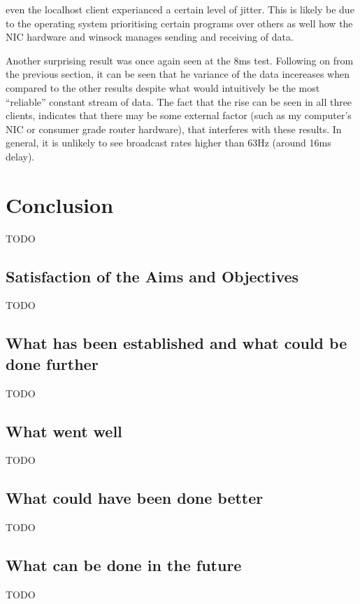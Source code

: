  even the localhost client experianced a certain level of jitter. This is likely be due to the operating system prioritising certain programs over others as well how the NIC hardware and winsock manages sending and receiving of data.

Another surprising result was once again seen at the 8ms test. Following on from the previous section, it can be seen that he variance of the data incereases when compared to the other results despite what would intuitively be the most ``reliable'' constant stream of data. The fact that the rise can be seen in all three clients, indicates that there may be some external factor (such as my computer's NIC or consumer grade router hardware), that interferes with these results. In general, it is unlikely to see broadcast rates higher than 63Hz (around 16ms delay).



\chapter{Conclusion}
TODO


\section{Satisfaction of the Aims and Objectives}
TODO


\section{What has been established and what could be done further}
TODO


\section{What went well}
TODO


\section{What could have been done better}
TODO


\section{What can be done in the future}
TODO
